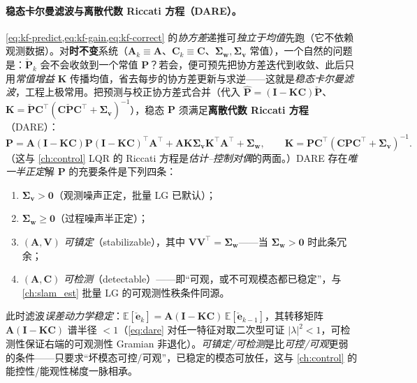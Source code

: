 \paragraph{稳态卡尔曼滤波与离散代数 Riccati 方程（DARE）。}
\cref{eq:kf-predict,eq:kf-gain,eq:kf-correct} 的\emph{协方差}递推可\emph{独立于均值}先跑（它不依赖观测数据）。对\textbf{时不变}系统（$\mathbf{A}_k\equiv\mathbf{A}$、$\mathbf{C}_k\equiv\mathbf{C}$、$\boldsymbol{\Sigma}_{\mathbf{w}},\boldsymbol{\Sigma}_{\mathbf{v}}$ 常值），一个自然的问题是：$\check{\mathbf{P}}_k$ 会不会收敛到一个常值 $\mathbf{P}$？若会，便可预先把协方差迭代到收敛、此后只用\emph{常值增益} $\mathbf{K}$ 传播均值，省去每步的协方差更新与求逆——这就是\emph{稳态卡尔曼滤波}，工程上极常用。把预测与校正协方差式合并（代入 $\hat{\mathbf{P}}=(\mathbf{I}-\mathbf{K}\mathbf{C})\check{\mathbf{P}}$、$\mathbf{K}=\check{\mathbf{P}}\mathbf{C}^\top(\mathbf{C}\check{\mathbf{P}}\mathbf{C}^\top+\boldsymbol{\Sigma}_{\mathbf{v}})^{-1}$），稳态 $\mathbf{P}$ 须满足\textbf{离散代数 Riccati 方程}（DARE）\cite{barfoot2024state}：
\begin{equation}
  \mathbf{P}=\mathbf{A}(\mathbf{I}-\mathbf{K}\mathbf{C})\mathbf{P}(\mathbf{I}-\mathbf{K}\mathbf{C})^\top\mathbf{A}^\top+\mathbf{A}\mathbf{K}\boldsymbol{\Sigma}_{\mathbf{v}}\mathbf{K}^\top\mathbf{A}^\top+\boldsymbol{\Sigma}_{\mathbf{w}},\qquad
  \mathbf{K}=\mathbf{P}\mathbf{C}^\top(\mathbf{C}\mathbf{P}\mathbf{C}^\top+\boldsymbol{\Sigma}_{\mathbf{v}})^{-1}.
  \label{eq:dare}
\end{equation}
（这与 \cref{ch:control} LQR 的 Riccati 方程是\emph{估计--控制对偶}的两面。）DARE 存在\emph{唯一半正定}解 $\mathbf{P}$ 的充要条件是下列四条\cite{barfoot2024state}：
\begin{enumerate}
  \item $\boldsymbol{\Sigma}_{\mathbf{v}}>\mathbf{0}$（观测噪声正定，批量 LG 已默认）；
  \item $\boldsymbol{\Sigma}_{\mathbf{w}}\ge\mathbf{0}$（过程噪声半正定）；
  \item $(\mathbf{A},\mathbf{V})$ \emph{可镇定}（stabilizable），其中 $\mathbf{V}\mathbf{V}^\top=\boldsymbol{\Sigma}_{\mathbf{w}}$——当 $\boldsymbol{\Sigma}_{\mathbf{w}}>\mathbf{0}$ 时此条冗余；
  \item $(\mathbf{A},\mathbf{C})$ \emph{可检测}（detectable）——即“可观，或不可观模态都已稳定”，与 \cref{ch:slam_est} 批量 LG 的可观测性秩条件同源。
\end{enumerate}
此时滤波\emph{误差动力学稳定}：$\mathbb{E}[\check{\mathbf{e}}_k]=\mathbf{A}(\mathbf{I}-\mathbf{K}\mathbf{C})\,\mathbb{E}[\check{\mathbf{e}}_{k-1}]$，其转移矩阵 $\mathbf{A}(\mathbf{I}-\mathbf{K}\mathbf{C})$ 谱半径 $<1$（\cref{eq:dare} 对任一特征对取二次型可证 $|\lambda|^2<1$，可检测性保证右端的可观测性 Gramian 非退化）\cite{barfoot2024state}。\emph{可镇定/可检测}是比\emph{可控/可观}更弱的条件——只要求“坏模态可控/可观”，已稳定的模态可放任，这与 \cref{ch:control} 的能控性/能观性梯度一脉相承。

